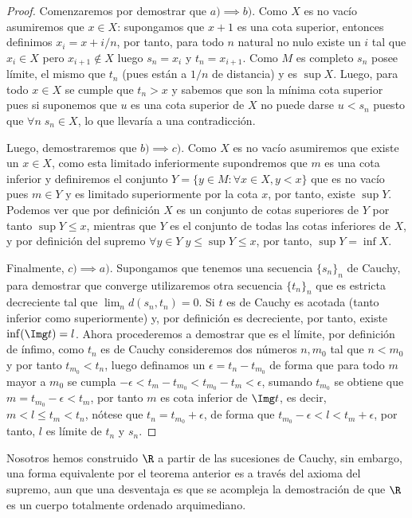 \documentclass[11pt,oneside,a4paper]{book}
\begin{document}
\begin{proof}
Comenzaremos por demostrar que $a)\implies b)$. Como $X$ es no vacío asumiremos que $x\in X$: supongamos que $x+1$ es una cota superior, entonces definimos $x_i=x+i/n$, por tanto, para todo $n$ natural no nulo existe un $i$ tal que $x_i\in X$ pero $x_{i+1}\notin X$ luego $s_n=x_i$ y $t_n=x_{i+1}$. Como $M$ es completo $s_n$ posee límite, el mismo que $t_n$ (pues están a $1/n$ de distancia) y es $\sup X$. Luego, para todo $x\in X$ se cumple que $t_n\gt x$ y sabemos que son la mínima cota superior pues si suponemos que $u$ es una cota superior de $X$ no puede darse $u\lt s_n$ puesto que $\forall n\;s_n\in X$, lo que llevaría a una contradicción.

Luego, demostraremos que $b)\implies c)$. Como $X$ es no vacío asumiremos que existe un $x\in X$, como esta limitado inferiormente supondremos que $m$ es una cota inferior y definiremos el conjunto $Y=\{y\in M:\forall x\in X, y\lt x\}$ que es no vacío pues $m\in Y$ y es limitado superiormente por la cota $x$, por tanto, existe $\sup Y$. Podemos ver que por definición $X$ es un conjunto de cotas superiores de $Y$ por tanto $\sup Y\leq x$, mientras que $Y$ es el conjunto de todas las cotas inferiores de $X$, y por definición del supremo $\forall y\in Y\;y\leq\sup Y\leq x$, por tanto, $\sup Y=\inf X$.

Finalmente, $c)\implies a)$. Supongamos que tenemos una secuencia $\{s_n\}_n$ de Cauchy, para demostrar que converge utilizaremos otra secuencia $\{t_n\}_n$ que es estricta decreciente tal que $\lim_n d(s_n,t_n)=0$. Si $t$ es de Cauchy es acotada (tanto inferior como superiormente) y, por definición es decreciente, por tanto, existe $\inf(\Img t)=l$. Ahora procederemos a demostrar que es el límite, por definición de ínfimo, como $t_n$ es de Cauchy consideremos dos números $n,m_0$ tal que $n\lt m_0$ y por tanto $t_{m_0}\lt t_n$, luego definamos un $\epsilon=t_n-t_{m_0}$ de forma que para todo $m$ mayor a $m_0$ se cumpla $-\epsilon\lt t_m-t_{m_0}\lt t_{m_0}-t_m\lt\epsilon$, sumando $t_
{m_0}$ se obtiene que $m=t_{m_0}-\epsilon\lt t_m$, por tanto $m$ es cota inferior de $\Img t$, es decir, $m\lt l\leq t_m\lt t_n$, nótese que $t_n=t_{m_0}+\epsilon$, de forma que $t_{m_0}-\epsilon\lt l\lt t_m+\epsilon$, por tanto, $l$ es límite de $t_n$ y $s_n$.
\end{proof}
Nosotros hemos construido $\R$ a partir de las sucesiones de Cauchy, sin embargo, una forma equivalente por el teorema anterior es a través del axioma del supremo, aun que una desventaja es que se acompleja la demostración de que $\R$ es un cuerpo totalmente ordenado arquimediano.
\end{document}

